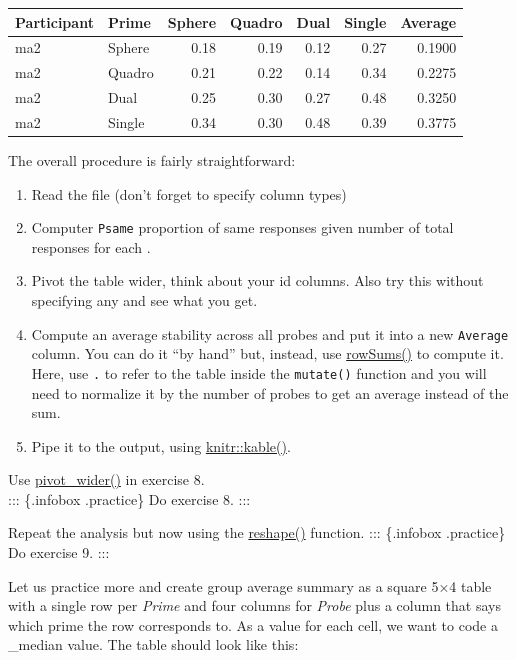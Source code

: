 \documentclass[
]{book}
\providecommand{\tightlist}{%
  \setlength{\itemsep}{0pt}\setlength{\parskip}{0pt}}
\begin{document}
\begin{tabular}{l|l|r|r|r|r|r}
\hline
Participant & Prime & Sphere & Quadro & Dual & Single & Average\\
\hline
ma2 & Sphere & 0.18 & 0.19 & 0.12 & 0.27 & 0.1900\\
\hline
ma2 & Quadro & 0.21 & 0.22 & 0.14 & 0.34 & 0.2275\\
\hline
ma2 & Dual & 0.25 & 0.30 & 0.27 & 0.48 & 0.3250\\
\hline
ma2 & Single & 0.34 & 0.30 & 0.48 & 0.39 & 0.3775\\
\hline
\end{tabular}

The overall procedure is fairly straightforward:

\begin{enumerate}
\def\labelenumi{\arabic{enumi}.}
\tightlist
\item
  Read the file (don't forget to specify column types)
\item
  Computer \texttt{Psame} proportion of same responses given number of total responses for each .
\item
  Pivot the table wider, think about your id columns. Also try this without specifying any and see what you get.
\item
  Compute an average stability across all probes and put it into a new \texttt{Average} column. You can do it ``by hand'' but, instead, use \href{https://stat.ethz.ch/R-manual/R-devel/library/base/html/colSums.html}{rowSums()} to compute it. Here, use \texttt{.} to refer to the table inside the \texttt{mutate()} function and you will need to normalize it by the number of probes to get an average instead of the sum.
\item
  Pipe it to the output, using \href{https://bookdown.org/yihui/rmarkdown-cookbook/kable.html}{knitr::kable()}.
\end{enumerate}

Use \href{https://tidyr.tidyverse.org/reference/pivot_wider.html}{pivot\_wider()} in exercise 8.\\
::: \{.infobox .practice\}
Do exercise 8.
:::

Repeat the analysis but now using the \href{https://stat.ethz.ch/R-manual/R-patched/library/stats/html/reshape.html}{reshape()} function.
::: \{.infobox .practice\}
Do exercise 9.
:::

Let us practice more and create group average summary as a square 5×4 table with a single row per \emph{Prime} and four columns for \emph{Probe} plus a column that says which prime the row corresponds to. As a value for each cell, we want to code a \_median value. The table should look like this:
\end{document}
